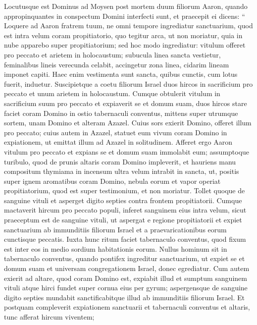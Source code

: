 \begin{biblechapter}
\begin{biblechapter}
\begin{biblechapter}
\begin{biblechapter}
\begin{biblechapter}
\begin{biblechapter}
\begin{biblechapter}
\begin{biblechapter}
\begin{biblechapter}
\begin{biblechapter}
\begin{biblechapter}
\begin{biblechapter}
\begin{biblechapter}
\begin{biblechapter}
\begin{biblechapter}
\begin{biblechapter}
\verse Locutusque est Dominus ad Moysen post mortem duum filiorum Aaron, quando appropinquantes in conspectum Domini interfecti sunt, 
\verse et praecepit ei dicens: “ Loquere ad Aaron fratrem tuum, ne omni tempore ingrediatur sanctuarium, quod est intra velum coram propitiatorio, quo tegitur arca, ut non moriatur, quia in nube apparebo super propitiatorium; 
\verse sed hoc modo ingrediatur: vitulum offeret pro peccato et arietem in holocaustum; 
\verse subucula linea sancta vestietur, feminalibus lineis verecunda celabit, accingetur zona linea, cidarim lineam imponet capiti. Haec enim vestimenta sunt sancta, quibus cunctis, cum lotus fuerit, induetur.
 \verse Suscipietque a coetu filiorum Israel duos hircos in sacrificium pro peccato et unum arietem in holocaustum. 
\verse Cumque obtulerit vitulum in sacrificium suum pro peccato et expiaverit se et domum suam, 
\verse duos hircos stare faciet coram Domino in ostio tabernaculi conventus, 
\verse mittens super utrumque sortem, unam Domino et alteram Azazel. 
\verse Cuius sors exierit Domino, offeret illum pro peccato; 
\verse cuius autem in Azazel, statuet eum vivum coram Domino in expiationem, ut emittat illum ad Azazel in solitudinem.
 \verse Afferet ergo Aaron vitulum pro peccato et expians se et domum suam immolabit eum; 
\verse assumptoque turibulo, quod de prunis altaris coram Domino impleverit, et hauriens manu compositum thymiama in incensum ultra velum intrabit in sancta, 
\verse ut, positis super ignem aromatibus coram Domino, nebula eorum et vapor operiat propitiatorium, quod est super testimonium, et non moriatur. 
\verse Tollet quoque de sanguine vituli et asperget digito septies contra frontem propitiatorii.
 \verse Cumque mactaverit hircum pro peccato populi, inferet sanguinem eius intra velum, sicut praeceptum est de sanguine vituli, ut aspergat e regione propitiatorii 
\verse et expiet sanctuarium ab immunditiis filiorum Israel et a praevaricationibus eorum cunctisque peccatis. Iuxta hunc ritum faciet tabernaculo conventus, quod fixum est inter eos in medio sordium habitationis eorum. 
\verse Nullus hominum sit in tabernaculo conventus, quando pontifex ingreditur sanctuarium, ut expiet se et domum suam et universam congregationem Israel, donec egrediatur. 
\verse Cum autem exierit ad altare, quod coram Domino est, expiabit illud et sumptum sanguinem vituli atque hirci fundet super cornua eius per gyrum; 
\verse aspergensque de sanguine digito septies mundabit sanctificabitque illud ab immunditiis filiorum Israel.
 \verse Et postquam compleverit expiationem sanctuarii et tabernaculi conventus et altaris, tunc afferat hircum viventem; 

\end{biblechapter}
\end{biblechapter}
\end{biblechapter}
\end{biblechapter}
\end{biblechapter}
\end{biblechapter}
\end{biblechapter}
\end{biblechapter}
\end{biblechapter}
\end{biblechapter}
\end{biblechapter}
\end{biblechapter}
\end{biblechapter}
\end{biblechapter}
\end{biblechapter}
\end{biblechapter}
